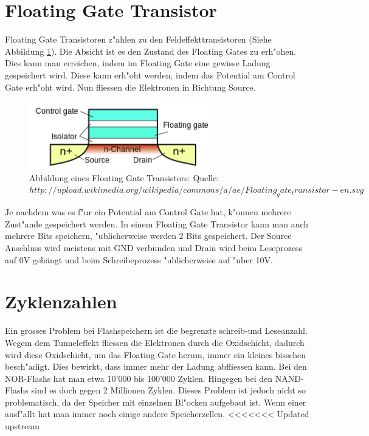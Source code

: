 \begin{refsection}
\section{Floating Gate Transistor}
Floating Gate Transistoren z"ahlen zu den Feldeffekttransistoren (Siehe Abbildung \ref{skript:Floatinggatetransistor}). Die Absicht ist es den Zustand des Floating Gates zu erh"ohen. Dies kann man erreichen, indem im Floating Gate eine gewisse Ladung gespeichert wird. Diese kann erh"oht werden, indem das Potential am Control Gate erh"oht wird. Nun fliessen die Elektronen in Richtung Source. 

\begin{figure}
\centering
\includegraphics[width=0.7\textwidth]{flash/graphics/Floatinggate.png}
\caption{Abbildung eines Floating Gate Transistors: Quelle: $http://upload.wikimedia.org/wikipedia/commons/a/ae/Floating_gate_transistor-en.svg$
\label{skript:Floatinggatetransistor}}
\end{figure}

Je nachdem was es f"ur ein Potential am Control Gate hat, k"onnen mehrere Zust"ande gespeichert werden. In einem Floating Gate Transistor kann man auch mehrere Bits speichern, "ublicherweise werden 2 Bits gespeichert. 
Der Source Anschluss wird meistens mit GND verbunden und Drain wird beim Leseprozess auf 0V gehängt und beim Schreibeprozess "ublicherweise auf "uber 10V. 


\section{Zyklenzahlen}
Ein grosses Problem bei Flashspeichern ist die begrenzte schreib-und Leseanzahl. Wegem dem Tunneleffekt fliessen die Elektronen durch die Oxidschicht, dadurch wird diese Oxidschicht, um das Floating Gate herum, immer ein kleines bisschen besch"adigt. Dies bewirkt, dass immer mehr der Ladung abfliessen kann. Bei den NOR-Flashs hat man etwa 10'000 bis 100'000 Zyklen. Hingegen bei den NAND-Flashs sind es doch gegen 2 Millionen Zyklen. Dieses Problem ist jedoch nicht so problematisch, da der Speicher mit einzelnen Bl"ocken aufgebaut ist. Wenn einer ausf"allt hat man immer noch einige andere Speicherzellen.
<<<<<<< Updated upstream


\end{refsection}
